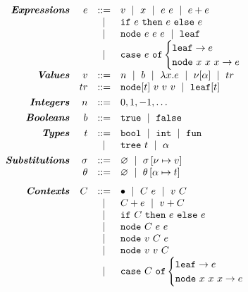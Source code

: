 \begin{figure}
$$
\begin{array}{rrcl}

\emphbf{Expressions}
  & e & ::=    & v \spmid x \spmid \eapp{e}{e} \spmid \eplus{e}{e}\\
  &   & \spmid & \eif{e}{e}{e} \\
  &   & \spmid & \enode{e}{e}{e} \spmid \eleaf \\
  &   & \spmid & \ecase{e}{e}{x}{x}{x}{e} \\[0.1in]

\emphbf{Values}
  & v  & ::= & n \spmid b \spmid \efun{x}{e} \spmid \vhole{\thole} \spmid tr \\
  & tr & ::= & \vnode{t}{v}{v}{v} \spmid \vleaf{t} \\[0.05in]

\emphbf{Integers}
  & n & ::= &  0,1,-1,\ldots \\[0.05in]

\emphbf{Booleans}
  & b & ::= &  \etrue \spmid \efalse \\[0.05in]

\emphbf{Types}
  & t & ::=     & \tbool \spmid \tint \spmid \tfun \\
  &   &  \spmid & \ttree{t} \spmid \thole \\[0.05in]

\emphbf{Substitutions}
  & \vsu & ::= & \emptysu \spmid \extendsu{\vsu}{\ehole}{v} \\
  & \tsu & ::= & \emptysu \spmid \extendsu{\tsu}{\thole}{t} \\[0.1in]
\emphbf{Contexts}
  & C
  & ::=
  &   	 \bullet
  \spmid \eapp{C}{e}
  \spmid \eapp{v}{C} \\
  & & \spmid & \eplus{C}{e} \spmid \eplus{v}{C} \\
  & & \spmid & \eif{C}{e}{e} \\
  & & \spmid & \enode{C}{e}{e} \\
  & & \spmid & \enode{v}{C}{e} \\
  & & \spmid & \enode{v}{v}{C} \\
  & & \spmid & \ecase{C}{e}{x}{x}{x}{e}
  \\[0.05in]
\end{array}
$$


\end{figure}
